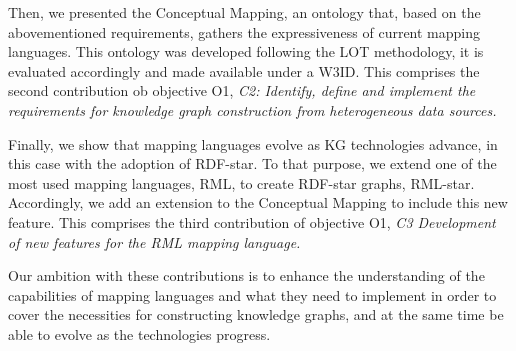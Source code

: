 Then, we presented the Conceptual Mapping, an ontology that, based on the abovementioned requirements, gathers the expressiveness of current mapping languages. This ontology was developed following the LOT methodology, it is evaluated accordingly and made available under a W3ID. 
This comprises the second contribution ob objective O1, \textit{C2: Identify, define and implement the requirements for knowledge graph construction from heterogeneous data sources.}

Finally, we show that mapping languages evolve as KG technologies advance, in this case with the adoption of RDF-star. To that purpose, we extend one of the most used mapping languages, RML, to create RDF-star graphs, RML-star. Accordingly, we add an extension to the Conceptual Mapping to include this new feature. This comprises the third contribution of objective O1, \textit{C3 Development of new features for the RML mapping language.}

Our ambition with these contributions is to enhance the understanding of the capabilities of mapping languages and what they need to implement in order to cover the necessities for constructing knowledge graphs, and at the same time be able to evolve as the technologies progress.